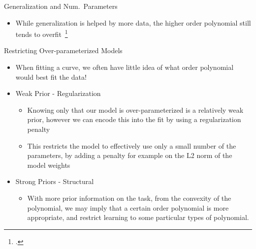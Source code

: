 \documentclass[t,xcolor=dvipsnames]{beamer}
\begin{document}
\begin{frame}{Generalization and Num.\ Parameters}
		\centering
			\resizebox{0.45\linewidth}{!}{}
			\resizebox{0.45\linewidth}{!}{}
			\label{fig:polyfit20th}
			\resizebox{0.45\linewidth}{!}{}
			\resizebox{0.45\linewidth}{!}{}
        \begin{itemize}
            \item While generalization is helped by more data, the higher order polynomial still tends to overfit~\footcite{denker1987large}
        \end{itemize}
\end{frame}


\begin{frame}{Restricting Over-parameterized Models}
\begin{itemize}
	\item When fitting a curve, we often have little idea of what order polynomial would best fit the data!
	\item Weak Prior - Regularization
	\begin{itemize}
	    \item Knowing only that our model is over-parameterized is a relatively weak prior, however we can encode this into the fit by using a regularization penalty
    	\item This restricts the model to effectively use only a small number of the parameters, by adding a penalty for example on the L2 norm of the model weights
	\end{itemize}
	\item Strong Priors - Structural
	\begin{itemize}
	    \item With more prior information on the task, \eg from the convexity of the polynomial, we may imply that a certain order polynomial is more appropriate, and restrict learning to some particular types of polynomial. %
	\end{itemize}
\end{itemize}
\end{frame}
\end{document}
